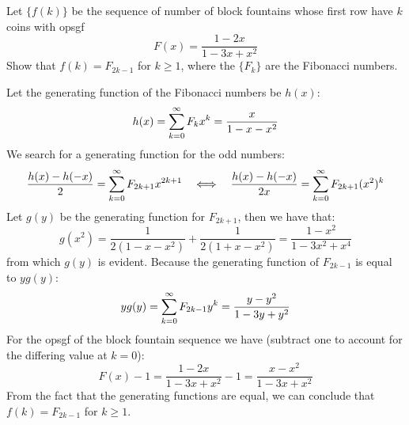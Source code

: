 \begin{exercise}
    Let $\{f(k)\}$ be the sequence of number of block fountains whose first row have $k$ coins with opsgf 
    \[
        F(x) = \frac{1-2x}{1-3x+x^2}
    \]
    Show that $f(k) = F_{2k-1}$ for $ k\geq 1$, where the $\{F_k\}$ are the Fibonacci numbers.
\end{exercise}
\begin{solution}
    Let the generating function of the Fibonacci numbers be $h(x)$:
    \[
        h(x) = \bsum[k] F_kx^k = \frac{x}{1-x-x^2}
    \]
    We search for a generating function for the odd numbers:
    \[
        \frac{h(x) - h(-x)}{2} = \bsum[k] F_{2k+1}x^{2k+1} \quad \Longleftrightarrow \quad
        \frac{h(x) - h(-x)}{2x} =\bsum[k] F_{2k+1}(x^2)^k
    \]
    Let $g(y)$ be the generating function for $F_{2k+1}$, then we have that:
    \[
        g(x^2) = \frac{1}{2(1-x-x^2)} + \frac{1}{2(1+x-x^2)} = \frac{1-x^2}{1-3x^2+x^4}
    \]
    from which $g(y)$ is evident. Because the generating function of $F_{2k-1}$ is equal to $yg(y)$:
    \[
        yg(y) = \bsum[k] F_{2k-1}y^k = \frac{y-y^2}{1-3y+y^2}
    \]
    For the opsgf of the block fountain sequence we have (subtract one to account for the differing value at $k=0$):
    \[
        F(x) - 1 = \frac{1-2x}{1-3x+x^2} - 1 = \frac{x-x^2}{1-3x+x^2}
    \]
    From the fact that the generating functions are equal, we can conclude that $f(k) = F_{2k-1}$ for $k\geq 1$.
\end{solution}

